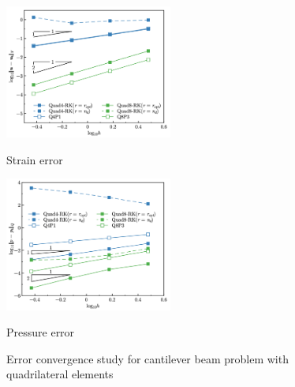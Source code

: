 \begin{figure}[H]
\centering
\begin{subcaptiongroup}
\centering
\parbox[b]{0.49\textwidth}{
    \includegraphics[width=0.49\textwidth]{cantilever_Hdev_r1.png}
    \caption{Strain error}\label{fg:cantilever_convergence_strain}
}
\parbox[b]{0.49\textwidth}{
    \includegraphics[width=0.49\textwidth]{cantilever_L2_p_r1.png}
    \caption{Pressure error}\label{fg:cantilever_convergence_pressure}
}
\end{subcaptiongroup}
\caption{Error convergence study for cantilever beam problem with quadrilateral elements}\label{fg:cantilever_convergence}
\end{figure}

